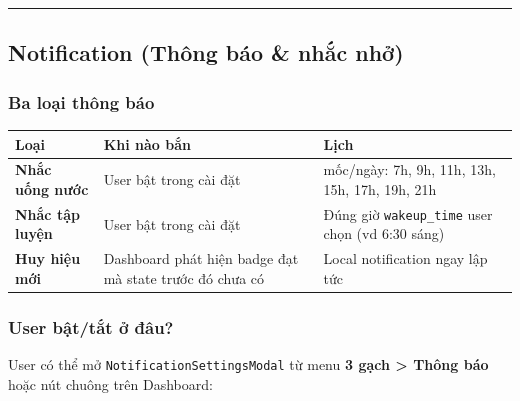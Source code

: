\documentclass[12pt,a4paper]{article}
\newcounter{none}
\begin{document}
\begin{center}\rule{0.5\linewidth}{0.5pt}\end{center}

\subsection{Notification (Thông báo \& nhắc
nhở)}\label{notification-thuxf4ng-buxe1o-nhux1eafc-nhux1edf}

\subsubsection{Ba loại thông báo}\label{ba-loux1ea1i-thuxf4ng-buxe1o}

{\def\LTcaptype{none} %
\begin{longtable}[]{@{}
  >{\raggedright\arraybackslash}p{}
  >{\raggedright\arraybackslash}p{}
  >{\raggedright\arraybackslash}p{}@{}}
\toprule\noalign{}
\begin{minipage}[b]{\linewidth}\raggedright
Loại
\end{minipage} & \begin{minipage}[b]{\linewidth}\raggedright
Khi nào bắn
\end{minipage} & \begin{minipage}[b]{\linewidth}\raggedright
Lịch
\end{minipage} \\
\midrule\noalign{}
\endhead
\bottomrule\noalign{}
\endlastfoot
\textbf{Nhắc uống nước} & User bật trong cài đặt & 8 mốc/ngày: 7h, 9h,
11h, 13h, 15h, 17h, 19h, 21h \\
\textbf{Nhắc tập luyện} & User bật trong cài đặt & Đúng giờ
\texttt{wakeup\_time} user chọn (vd 6:30 sáng) \\
\textbf{Huy hiệu mới} & Dashboard phát hiện badge đạt mà state trước đó
chưa có & Local notification ngay lập tức \\
\end{longtable}
}

\subsubsection{User bật/tắt ở
đâu?}\label{user-bux1eadttux1eaft-ux1edf-ux111uxe2u}

User có thể mở \texttt{NotificationSettingsModal} từ menu \textbf{3 gạch
\textgreater{} Thông báo} hoặc nút chuông trên Dashboard:
\end{document}

